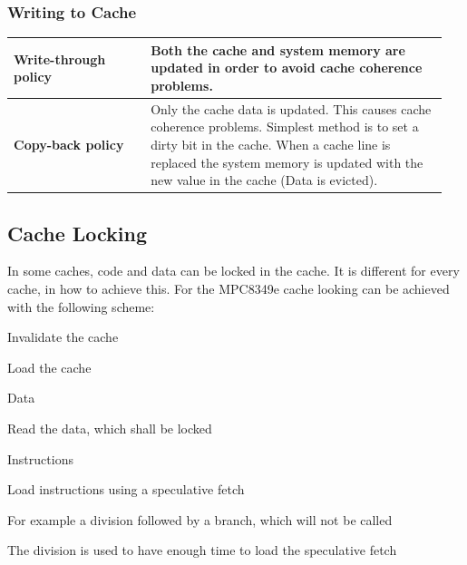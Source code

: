 		\subsubsection{Writing to Cache}
			\begin{table}[H]
				\centering
				\begin{tabular}{|>{\bfseries}p{0.3\linewidth}|p{0.65\linewidth}|}
					\hline
					Write-through policy
						& Both the cache and system memory are updated in order to avoid cache coherence problems.\\
					\hline
					Copy-back policy
						& Only the cache data is updated. This causes cache coherence problems. Simplest method is to set a dirty bit in the cache. When a cache line is replaced the system memory is updated with the new value in the cache (Data is evicted).\\
					\hline
				\end{tabular}
			\end{table}
			
	\subsection{Cache Locking}
		In some caches, code and data can be locked in the cache. It is different for every cache, in how to achieve this. For the MPC8349e cache looking can be achieved with the following scheme:
		\begin{compactenum}
			\item Invalidate the cache
			\item Load the cache
				\begin{compactitem}
					\item Data
						\begin{compactenum}
							\item Read the data, which shall be locked
						\end{compactenum}
					\item Instructions
						\begin{compactenum}
							\item Load instructions using a speculative fetch
							\item For example a division followed by a branch, which will not be called
							\item The division is used to have enough time to load the speculative fetch
						\end{compactenum}
				\end{compactitem}
		\end{compactenum}
		
